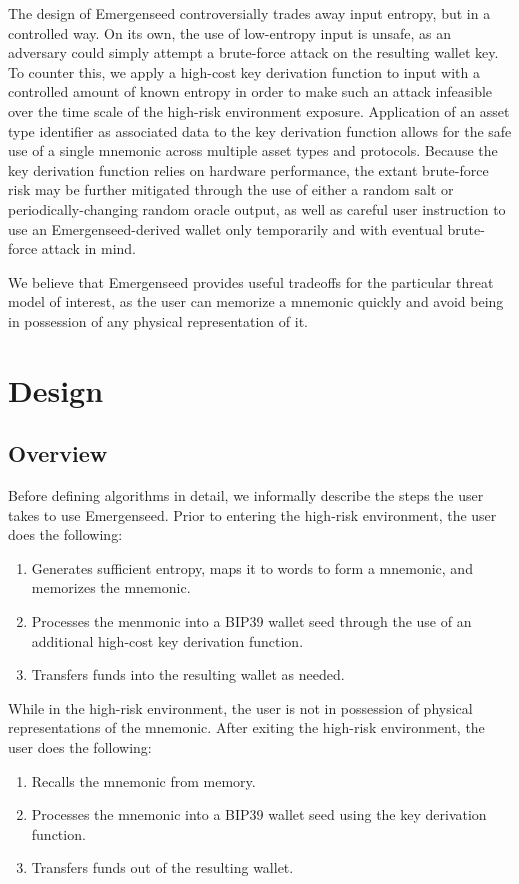 \documentclass{article}
\begin{document}
The design of Emergenseed controversially trades away input entropy, but in a controlled way.
On its own, the use of low-entropy input is unsafe, as an adversary could simply attempt a brute-force attack on the resulting wallet key.
To counter this, we apply a high-cost key derivation function to input with a controlled amount of known entropy in order to make such an attack infeasible over the time scale of the high-risk environment exposure.
Application of an asset type identifier as associated data to the key derivation function allows for the safe use of a single mnemonic across multiple asset types and protocols.
Because the key derivation function relies on hardware performance, the extant brute-force risk may be further mitigated through the use of either a random salt or periodically-changing random oracle output, as well as careful user instruction to use an Emergenseed-derived wallet only temporarily and with eventual brute-force attack in mind.

We believe that Emergenseed provides useful tradeoffs for the particular threat model of interest, as the user can memorize a mnemonic quickly and avoid being in possession of any physical representation of it.


\section{Design}

\subsection{Overview}

Before defining algorithms in detail, we informally describe the steps the user takes to use Emergenseed.
Prior to entering the high-risk environment, the user does the following:
\begin{enumerate}
	\item Generates sufficient entropy, maps it to words to form a mnemonic, and memorizes the mnemonic.
	\item Processes the menmonic into a BIP39 wallet seed through the use of an additional high-cost key derivation function.
	\item Transfers funds into the resulting wallet as needed.
\end{enumerate}
While in the high-risk environment, the user is not in possession of physical representations of the mnemonic.
After exiting the high-risk environment, the user does the following:
\begin{enumerate}
	\item Recalls the mnemonic from memory.
	\item Processes the mnemonic into a BIP39 wallet seed using the key derivation function.
	\item Transfers funds out of the resulting wallet.
\end{enumerate}
\end{document}
